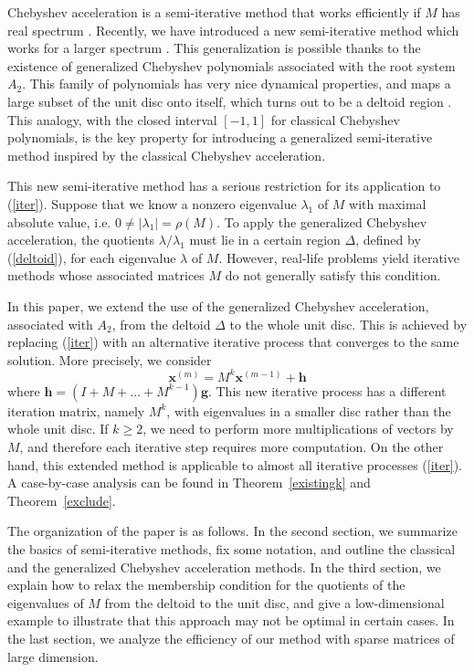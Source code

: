 \documentclass[reqno]{amsart}
\newcommand{\mb}{\mathbf}
\numberwithin{equation}{section}
\theoremstyle{plain}
\theoremstyle{definition}
\begin{document}
Chebyshev acceleration is a semi-iterative method that works efficiently if $M$ has real spectrum \cite{varga}. Recently, we have introduced a new semi-iterative method which works for a larger spectrum \cite{gokgoz}. This generalization is possible thanks to the existence of generalized Chebyshev polynomials associated with the root system $A_2$. This family of polynomials has very nice dynamical properties, and maps a large subset of the unit disc onto itself, which turns out to be a deltoid region \cite{veselov, veselov-survey}. This analogy, with the closed interval $[-1,1]$ for classical Chebyshev polynomials, is the key property for introducing a generalized semi-iterative method inspired by the classical Chebyshev acceleration.

This new semi-iterative method has a serious restriction for its application to (\ref{iter}). Suppose that we know a nonzero eigenvalue $\lambda_1$ of $M$ with maximal absolute value, i.e. $0\neq |\lambda_1|=\rho(M)$. To apply the generalized Chebyshev acceleration, the quotients $\lambda/\lambda_1$ must lie in a certain region $\Delta$, defined by (\ref{deltoid}), for each eigenvalue $\lambda$ of $M$. However, real-life problems yield iterative methods whose associated matrices $M$ do not generally satisfy this condition.

In this paper, we extend the use of the generalized Chebyshev acceleration, associated with $A_2$, from the deltoid $\Delta$ to the whole unit disc. This is achieved by replacing (\ref{iter}) with an alternative iterative process that converges to the same solution. More precisely, we consider
\begin{equation}\label{newiter}
	\mb{x}^{(m)}=M^k\mb{x}^{(m-1)}+\mb{h}
\end{equation}
where  $\mb{h} = (I+M+\ldots + M^{k-1})\mb{g}$. This new iterative process has a different iteration matrix, namely $M^k$, with eigenvalues in a smaller disc rather than the whole unit disc. If $k\geq 2$, we need to perform more multiplications of vectors by $M$, and therefore each iterative step requires more computation. On the other hand, this extended method is applicable to almost all iterative processes (\ref{iter}). A case-by-case analysis can be found in Theorem~\ref{existingk} and Theorem~\ref{exclude}.

The organization of the paper is as follows. In the second section, we summarize the basics of semi-iterative methods, fix some notation, and outline the classical and the generalized Chebyshev acceleration methods. In the third section, we explain how to relax the membership condition for the quotients of the eigenvalues of $M$ from the deltoid to the unit disc, and give a low-dimensional example to illustrate that this approach may not be optimal in certain cases. In the last section, we analyze the efficiency of our method with sparse matrices of large dimension.
\end{document}
